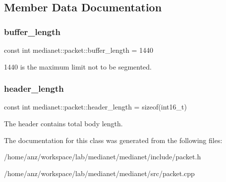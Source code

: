 \subsection{Member Data Documentation}
\mbox{\label{classmedianet_1_1packet_a9446ace51bb94ea42f48a392fc1290fc}} 
\subsubsection{\texorpdfstring{buffer\_length}{buffer\_length}}
{\footnotesize\ttfamily const int medianet\+::packet\+::buffer\+\_\+length = 1440\hspace{0.3cm}{\ttfamily [static]}}



1440 is the maximum limit not to be segmented. 

\mbox{\label{classmedianet_1_1packet_aafdea17c1dd88878ae574cc936816451}} 
\subsubsection{\texorpdfstring{header\_length}{header\_length}}
{\footnotesize\ttfamily const int medianet\+::packet\+::header\+\_\+length = sizeof(int16\+\_\+t)\hspace{0.3cm}{\ttfamily [static]}}



The header contains total body length. 



The documentation for this class was generated from the following files\+:\begin{DoxyCompactItemize}
\item 
/home/anz/workspace/lab/medianet/medianet/include/packet.\+h\item 
/home/anz/workspace/lab/medianet/medianet/src/packet.\+cpp\end{DoxyCompactItemize}
